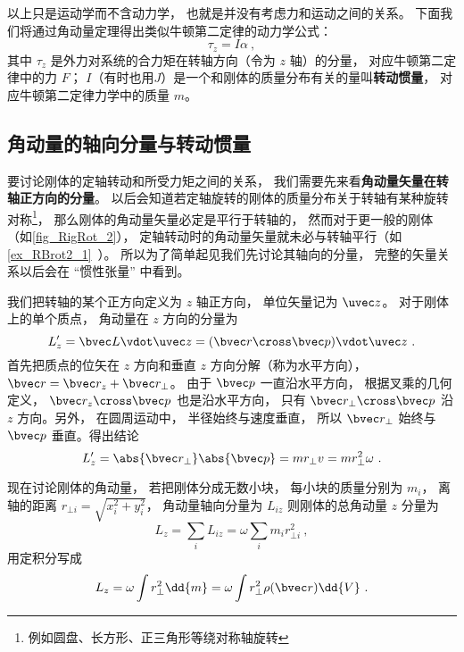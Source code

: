 以上只是运动学而不含动力学， 也就是并没有考虑力和运动之间的关系。 下面我们将通过角动量定理得出类似牛顿第二定律的动力学公式：
\begin{equation}
\tau_z = I \alpha~,
\end{equation}
其中 $\tau_z$ 是外力对系统的合力矩在转轴方向（令为 $z$ 轴）的分量， 对应牛顿第二定律中的力 $F$； $I$（有时也用$J$）是一个和刚体的质量分布有关的量叫\textbf{转动惯量}， 对应牛顿第二定律力学中的质量 $m$。

\subsection{角动量的轴向分量与转动惯量}
要讨论刚体的定轴转动和所受力矩之间的关系， 我们需要先来看\textbf{角动量矢量在转轴正方向的分量}。 以后会知道若定轴旋转的刚体的质量分布关于转轴有某种旋转对称\footnote{例如圆盘、长方形、正三角形等绕对称轴旋转}， 那么刚体的角动量矢量必定是平行于转轴的， 然而对于更一般的刚体（如\autoref{fig_RigRot_2}）， 定轴转动时的角动量矢量就未必与转轴平行（如\autoref{ex_RBrot2_1}~）。 所以为了简单起见我们先讨论其轴向的分量， 完整的矢量关系以后会在 “惯性张量” 中看到。

我们把转轴的某个正方向定义为 $z$ 轴正方向， 单位矢量记为 $\uvec z$。 对于刚体上的单个质点， 角动量在 $z$ 方向的分量为
\begin{equation}
L'_{z} = \bvec L \vdot \uvec z = (\bvec r \cross \bvec p) \vdot \uvec z~.
\end{equation}
首先把质点的位矢在 $z$ 方向和垂直 $z$ 方向分解（称为水平方向）， $\bvec r = \bvec r_z + \bvec r_ \bot$。 由于 $\bvec p$ 一直沿水平方向， 根据叉乘的几何定义， $\bvec r_z \cross \bvec p$ 也是沿水平方向， 只有 $\bvec r_ \bot \cross \bvec p$ 沿 $z$ 方向。另外， 在圆周运动中， 半径始终与速度垂直， 所以 $\bvec r_ \bot$ 始终与 $\bvec p$ 垂直。得出结论
\begin{equation}
L'_z = \abs{\bvec r_\bot} \abs{\bvec p} = m r_ \bot v = mr_ \bot ^2\omega ~.
\end{equation}

现在讨论刚体的角动量， 若把刚体分成无数小块， 每小块的质量分别为 $m_i$， 离轴的距离 $r_{\bot i} = \sqrt{x_i^2 + y_i^2} $， 角动量轴向分量为 $L_{iz}$ 则刚体的总角动量 $z$ 分量为
\begin{equation}
L_z = \sum_i L_{iz} = \omega \sum_i m_i r_{ \bot i}^2~,
\end{equation}
用定积分写成
\begin{equation}
L_z = \omega \int r_ \bot ^2 \dd{m} = \omega \int r_ \bot ^2\rho(\bvec r)  \dd{V} ~.
\end{equation}

